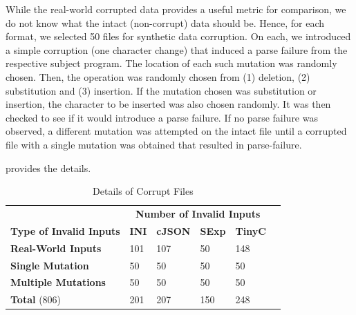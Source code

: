 \documentclass[sigconf,review,anonymous]{acmart}
\begin{document}
While the real-world corrupted data provides a useful metric for comparison,
we do not know what the intact (non-corrupt) data should be. Hence,
for each format, we selected 50 files for synthetic data corruption. On each,
we introduced a simple corruption (one character change) that induced a
parse failure from the respective subject program. The location of each 
such mutation was randomly chosen. Then, the operation was randomly chosen
from (1) deletion, (2) substitution and (3) insertion. If the mutation
chosen was substitution or insertion, the character to be inserted was
also chosen randomly. It was then checked to see if it would introduce
a parse failure. If no parse failure was observed, a different mutation
was attempted on the intact file until a corrupted file with a single
mutation was obtained that resulted in parse-failure.

 provides the details.

\begin{table}[!tbp]\centering
  \footnotesize
\caption{Details of Corrupt Files}
\begin{tabular}{|p{3cm}|p{1cm}|p{1cm}|p{1cm}|p{1cm}|p{1cm}|}
\hline
&  \multicolumn{4}{c|}{\textbf{Number of Invalid Inputs}}  \\
\textbf{Type of Invalid Inputs} & \textbf{INI} & \textbf{cJSON} & \textbf{SExp} & \textbf{TinyC} \\
\hline
\textbf{Real-World Inputs} & 101 & 107 & 50 & 148 \\
\textbf{Single Mutation} & 50 & 50 & 50 & 50 \\
\textbf{Multiple Mutations} & 50 & 50 & 50 & 50 \\
\hline
\textbf{Total } (806) & 201 & 207 & 150 & 248 \\
\hline
\end{tabular}
\label{tab:inputdetails}
\end{table}
\end{document}
